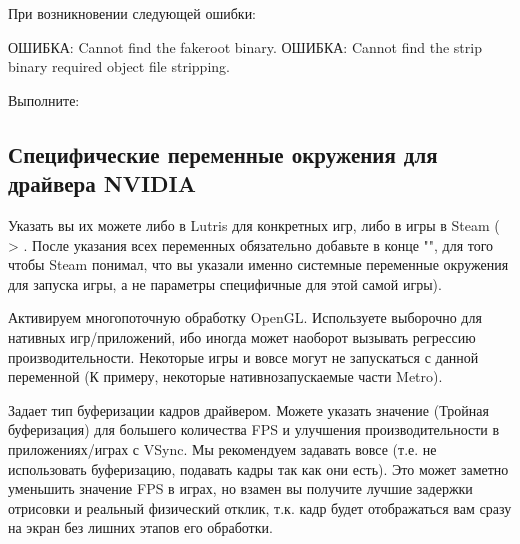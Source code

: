 \documentclass[letterpaper,10pt,russian,openany]{sphinxmanual}
\begin{document}
\sphinxAtStartPar
При возникновении следующей ошибки:

\begin{sphinxVerbatim}[commandchars=\\\{\}]
\PYGZgt{} ОШИБКА: Cannot find the fakeroot binary.
\PYGZgt{} ОШИБКА: Cannot find the strip binary required  object file stripping.
\end{sphinxVerbatim}

\sphinxAtStartPar
Выполните: 

\ignorespaces 

\subsection{Специфические переменные окружения для драйвера NVIDIA}
\label{\detokenize{source/first-steps:nvidia-env-vars}}\label{\detokenize{source/first-steps:index-10}}\label{\detokenize{source/first-steps:id10}}
\sphinxAtStartPar
Указать вы их можете либо в Lutris для конкретных игр, либо в  игры в Steam
( \sphinxhyphen{}> . После указания всех переменных обязательно добавьте в конце "",
для того чтобы Steam понимал, что вы указали именно системные переменные окружения для запуска игры, а не параметры специфичные для этой самой игры).

\sphinxAtStartPar
{}  \sphinxhyphen{}  Активируем многопоточную обработку OpenGL.
Используете выборочно для нативных игр/приложений, ибо иногда может наоборот вызывать регрессию производительности.
Некоторые игры и вовсе могут не запускаться с данной переменной (К примеру, некоторые нативно\sphinxhyphen{}запускаемые части Metro).

\sphinxAtStartPar
{}  \sphinxhyphen{} Задает тип буферизации кадров драйвером.
Можете указать значение  (Тройная буферизация) для большего количества FPS и улучшения производительности в приложениях/играх с VSync.
Мы рекомендуем задавать вовсе  (т.е. не использовать буферизацию, подавать кадры так как они есть).
Это может заметно уменьшить значение FPS в играх, но взамен вы получите лучшие задержки отрисовки и реальный физический отклик,
т.к. кадр будет отображаться вам сразу на экран без лишних этапов его обработки.
\end{document}
